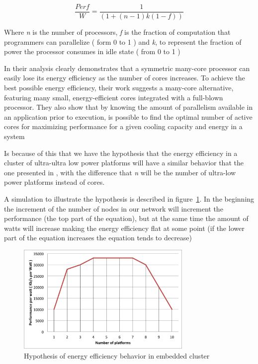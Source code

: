 \begin{equation}\label{eq:1} \frac{Perf}{W} = \frac{1}{(1 + (n -1 ) k (1 - f))}
\end{equation}

Where \textit{n} is the number of processors,  \textit{f} is the fraction of
computation that programmers can parallelize  ( form 0 to 1 ) and \textit{k},
to represent the fraction of power the processor consumes in idle state  ( from
0 to 1 )

In \cite{Dong} their analysis clearly demonstrates that a symmetric many-core
processor can easily  lose its energy efficiency as the number of cores
increases. To achieve the  best possible energy efficiency, their  work
suggests a many-core alternative, featuring many small, energy-efficient cores
integrated with a full-blown processor. They also show that by knowing the
amount of parallelism available in an application prior to execution, is
possible to  find the optimal number of active cores for maximizing performance
for a given cooling capacity and energy in a system

Is because of this that we have the hypothesis that the energy efficiency in a
cluster of ultra-ultra low power platforms will have a similar behavior that
the one presented in \cite{Dong} , with the difference that \textit{n} will be
the number of ultra-low power platforms instead of cores. 

A simulation to illustrate the hypothesis is described in figure~\ref{fig:1.2}.
In the beginning the increment of the number of nodes in our network will
increment the performance (the top part of the equation), but at the same time
the amount of watts will increase making the energy efficiency flat at some
point (if the lower part of the equation increases the equation tends to
decrease)

\begin{figure}[H] \centering
\includegraphics[width=0.75\textwidth]{images/hypothesys.png}
\caption{Hypothesis of energy efficiency behavior in embedded cluster}
\label{fig:1.2} \end{figure}

